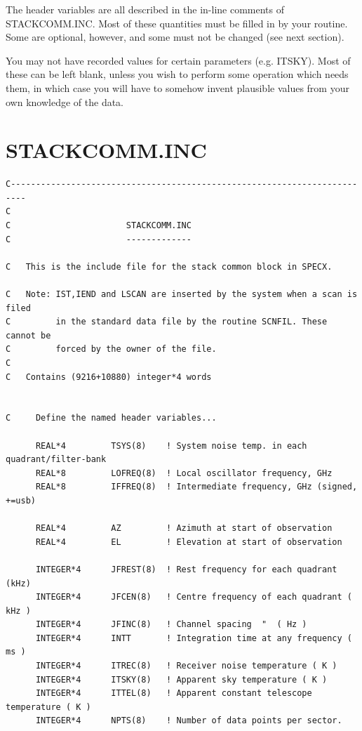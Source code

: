 \documentclass[11pt,twoside]{report}
\begin{document}
The header variables are all described in the in-line comments of
STACKCOMM.INC. Most of these quantities must be filled in by your
routine. Some are optional, however, and some must not be changed
(see next section).

You may not have recorded values for certain parameters (e.g. ITSKY).
Most of these can be left blank, unless you wish to perform some
operation which needs them, in which case you will have to somehow
invent plausible values from your own knowledge of the data. 
                          
\newpage
\section{STACKCOMM.INC}   
\begin{verbatim}
C-------------------------------------------------------------------------
C
C                       STACKCOMM.INC
C                       -------------

C   This is the include file for the stack common block in SPECX.

C   Note: IST,IEND and LSCAN are inserted by the system when a scan is filed
C         in the standard data file by the routine SCNFIL. These cannot be
C         forced by the owner of the file.
C
C   Contains (9216+10880) integer*4 words


C     Define the named header variables...

      REAL*4         TSYS(8)    ! System noise temp. in each quadrant/filter-bank
      REAL*8         LOFREQ(8)  ! Local oscillator frequency, GHz
      REAL*8         IFFREQ(8)  ! Intermediate frequency, GHz (signed, +=usb)

      REAL*4         AZ         ! Azimuth at start of observation
      REAL*4         EL         ! Elevation at start of observation

      INTEGER*4      JFREST(8)  ! Rest frequency for each quadrant (kHz)
      INTEGER*4      JFCEN(8)   ! Centre frequency of each quadrant ( kHz )
      INTEGER*4      JFINC(8)   ! Channel spacing  "  ( Hz )
      INTEGER*4      INTT       ! Integration time at any frequency ( ms )
      INTEGER*4      ITREC(8)   ! Receiver noise temperature ( K )
      INTEGER*4      ITSKY(8)   ! Apparent sky temperature ( K )
      INTEGER*4      ITTEL(8)   ! Apparent constant telescope temperature ( K )
      INTEGER*4      NPTS(8)    ! Number of data points per sector.


\end{verbatim}
\end{document}
